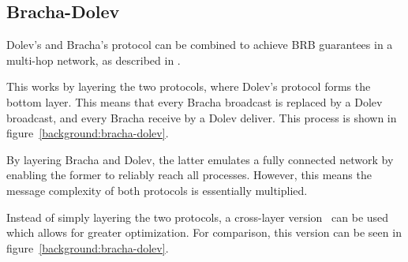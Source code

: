 \subsection*{Bracha-Dolev}
Dolev's and Bracha's protocol can be combined to achieve BRB guarantees in a multi-hop network, as described in \cite{bracha-dolev}. 

This works by layering the two protocols, where Dolev's protocol forms the bottom layer. This means that every Bracha broadcast is replaced by a Dolev broadcast, and every Bracha receive by a Dolev deliver. This process is shown in figure~\ref{background:bracha-dolev}.

By layering Bracha and Dolev, the latter emulates a fully connected network by enabling the former to reliably reach all processes. However, this means the message complexity of both protocols %
is essentially multiplied.

Instead of simply layering the two protocols, a cross-layer version~\cite{bonomi2021practical} can be used which allows for greater optimization. For comparison, this version can be seen in figure~\ref{background:bracha-dolev}.

